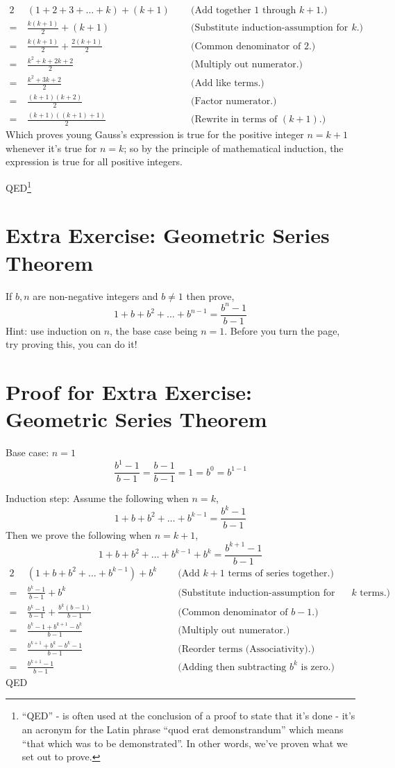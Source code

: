 \documentclass{article}
\begin{document}
\begin{alignat*}{2}
&(1+2+3+\ldots+k) + (k+1) \;\;  &&\text{(Add together 1 through }k+1\text{.)}\\
=\ &\frac{k(k+1)}{2} + (k+1) &&\text{(Substitute induction-assumption for 1 through }k\text{.)}\\
=\ &\frac{k(k+1)}{2} + \frac{2(k+1)}{2} &&\text{(Common denominator of 2.)}\\
=\ &\frac{k^2+k+2k+2}{2} &&\text{(Multiply out numerator.)}\\
=\ &\frac{k^2+3k+2}{2} &&\text{(Add like terms.)}\\
=\ &\frac{(k+1)(k+2)}{2} &&\text{(Factor numerator.)}\\
=\ &\frac{(k+1)((k+1)+1)}{2} &&\text{(Rewrite in terms of }(k+1)\text{.)}
\end{alignat*}
Which proves young Gauss's expression is true for
the positive integer $n = k+1$ whenever it's true for $n = k$; so
by the principle of mathematical induction,
the expression is true for all positive integers.

\hspace*{\fill}QED\footnote{``QED'' - is
often used at the conclusion of a proof to state that it's
done - it's an acronym for the Latin phrase
``quod erat demonstrandum'' which means ``that which was to be demonstrated''.
In other words, we've proven what we set out to prove.}

\section*{Extra Exercise: Geometric Series Theorem}
If $b, n$ are non-negative integers and $b\ne1$ then prove,
\[1+b+b^2+\dots+b^{n-1} = \frac{b^n-1}{b-1}\]
Hint: use induction on $n$, the base case being $n=1$.  Before you turn the page, try proving this, you can do it!

\break
\section*{Proof for Extra Exercise: Geometric Series Theorem}
Base case: $n=1$
\[\frac{b^1-1}{b-1}=\frac{b-1}{b-1}=1=b^0=b^{1-1}\]

Induction step:
Assume the following when \(n = k\),
\[1+b+b^2+\dots+b^{k-1} = \frac{b^k-1}{b-1}\]
Then we prove the following when \(n = k + 1\),
\[1+b+b^2+\dots+b^{k-1}+b^k = \frac{b^{k+1}-1}{b-1}\]
\begin{alignat*}{2}
&(1+b+b^2+\dots+b^{k-1}) + b^k  \;\;  &&\text{(Add }k+1\text{ terms of series together.)}\\
=\ &\frac{b^k-1}{b-1}+b^k &&\text{(Substitute induction-assumption for first }k\text{ terms.)}\\
=\ &\frac{b^k-1}{b-1}+\frac{b^k(b-1)}{b-1}  &&\text{(Common denominator of }b-1\text{.)}\\
=\ &\frac{b^k-1+b^{k+1}-b^k}{b-1} &&\text{(Multiply out numerator.)}\\
=\ &\frac{b^{k+1}+b^k-b^k-1}{b-1} &&\text{(Reorder terms (Associativity).)}\\
=\ &\frac{b^{k+1}-1}{b-1} &&\text{(Adding then subtracting }b^k\text{ is zero.)}
\end{alignat*}
\hspace*{\fill}QED
\end{document}
